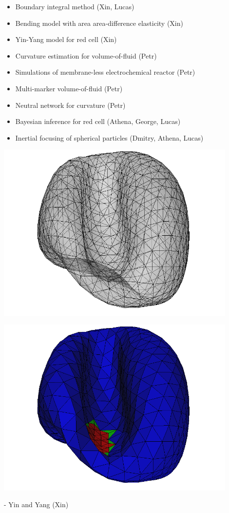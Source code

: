 \begin{itemize}
\item Boundary integral method (Xin, Lucas)
\item Bending model with area area-difference elasticity (Xin)
\item Yin-Yang model for red cell (Xin)
\item Curvature estimation for volume-of-fluid (Petr)
\item Simulations of membrane-less electrochemical reactor (Petr)
\item Multi-marker volume-of-fluid (Petr)
\item Neutral network for curvature (Petr)
\item Bayesian inference for red cell (Athena, George, Lucas)
\item Inertial focusing of spherical particles (Dmitry, Athena, Lucas)
\end{itemize}
\eframe

\begin{center}
  \includegraphics[width=0.9\textwidth]{i/b.png}
\end{center}
\eframe

\begin{center}
  \includegraphics[width=0.9\textwidth]{i/a.png}
\end{center}
\eframe

- Yin and Yang (Xin)
\eframe
